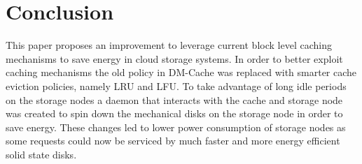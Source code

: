 \section{Conclusion}
\label{sec:conclusion}

This paper proposes an improvement to leverage current block level caching
mechanisms to save energy in cloud storage systems. In order to better exploit
caching mechanisms the old policy in DM-Cache was replaced with smarter cache
eviction policies, namely LRU and LFU. To take advantage of long idle periods on
the storage nodes a daemon that interacts with the cache and storage node was
created to spin down the mechanical disks on the storage node in order to save
energy. These changes led to lower power consumption of storage nodes as some
requests could now be serviced by much faster and more energy efficient solid
state disks.
